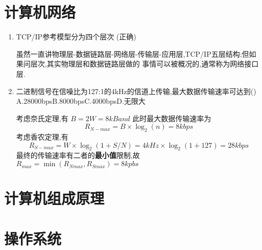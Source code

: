 \documentclass[12pt, a4paper, oneside, UTF8]{ctexbook}
\begin{document}
\section{计算机网络}
\begin{enumerate}
    \item TCP/IP参考模型分为四个层次 (正确) 
    \begin{solution}
        虽然一直讲物理层-数据链路层-网络层-传输层-应用层,TCP/IP五层结构;但如果问层次,其实物理层和数据链路层做的
        事情可以被概况的,通常称为网络接口层.
    \end{solution}
    \item 二进制信号在信噪比为127:1的4kHz的信道上传输,最大数据传输速率可达到() \\
    A.28000bps\qquad B.8000bps\qquad C.4000bps\qquad D.无限大
    \begin{solution}
        考虑奈氏定理,有 $B=2W=8kBand$ 此时最大数据传输速率为 $$R_{N-max}= B\times\log_{2}(n)=8kbps$$ 
        考虑香农定理,有 $$R_{S-max}=W\times\log_{2}(1+S/N)=4kHz\times\log_{2}(1+127)=28kbps$$ 
        最终的传输速率有二者的{\textbf{最小值}}限制,故$R_{max}=\min{(R_{Nmax},R_{Smax})}=8kpbs$
    \end{solution}
\end{enumerate}

\section{计算机组成原理}

\section{操作系统}
\ifx\allfiles\undefined
\end{document}
